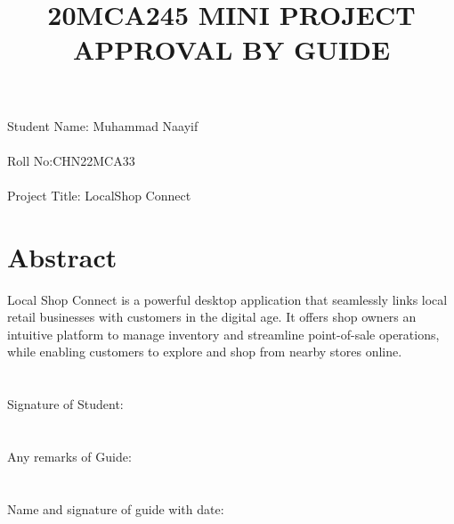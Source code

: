 \documentclass[a4paper]{article}
\title{20MCA245 MINI PROJECT\\APPROVAL BY GUIDE}
\date{}
\author{}
\begin{document}
\maketitle
\section*{}
Student Name: Muhammad Naayif\\\\Roll No:CHN22MCA33\\\\Project Title: LocalShop Connect

\section*{Abstract}
Local Shop Connect is a powerful desktop application that seamlessly links local retail businesses with customers in the digital age. It offers shop owners an intuitive platform to manage inventory and streamline point-of-sale operations, while enabling customers to explore and shop from nearby stores online.
\section*{}
Signature of Student:\\\\\\Any remarks of Guide:\\\\\\Name and signature of guide with date: 
\end{document}
